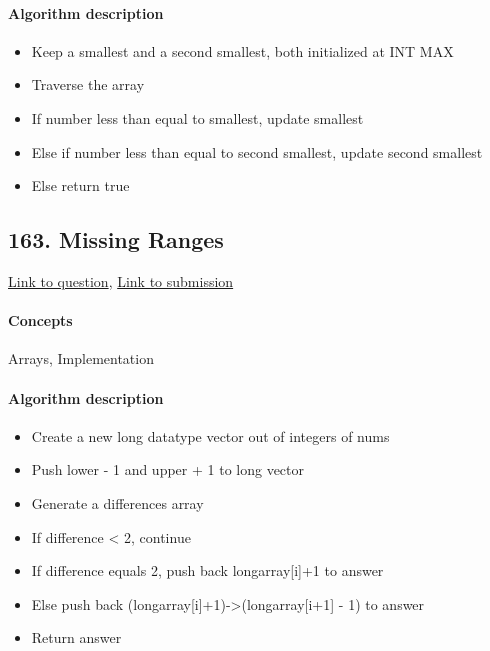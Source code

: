 \documentclass[11pt]{book}
\begin{document}
\paragraph{Algorithm description}
\begin{itemize}
    \item Keep a smallest and a second smallest, both initialized at INT MAX
    \item Traverse the array
    \item If number less than equal to smallest, update smallest
    \item Else if number less than equal to second smallest, update second smallest
    \item Else return true
\end{itemize}

\subsection{163. Missing Ranges}
\href{https://leetcode.com/problems/missing-ranges/}{Link to question},
\href{https://leetcode.com/submissions/detail/337760992/}{Link to submission}
\paragraph{Concepts}
Arrays, Implementation
\paragraph{Algorithm description}
\begin{itemize}
    \item Create a new long datatype vector out of integers of nums
    \item Push lower - 1 and upper + 1 to long vector
    \item Generate a differences array 
    \item If difference < 2, continue
    \item If difference equals 2, push back longarray[i]+1 to answer
    \item Else push back (longarray[i]+1)->(longarray[i+1] - 1) to answer
    \item Return answer
\end{itemize}

\end{document}
